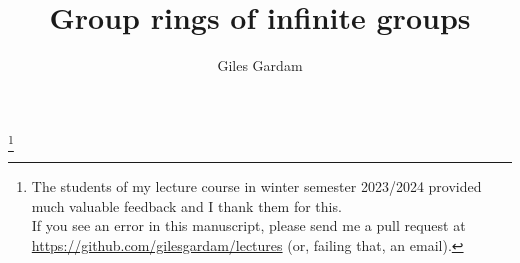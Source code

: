 \documentclass[oneside]{amsbook}
\theoremstyle{definition}
\theoremstyle{remark}
\numberwithin{section}{chapter}
\numberwithin{equation}{chapter}
\begin{document}
\frontmatter

\title{Group rings of infinite groups}
\author{Giles Gardam}
\address{University of Bonn}
\thanks{The students of my lecture course in winter semester 2023/2024 provided much valuable feedback and I thank them for this. \\ If you see an error in this manuscript, please send me a pull request at \url{https://github.com/gilesgardam/lectures} (or, failing that, an email).}

\maketitle
\tableofcontents


\mainmatter



\appendix



\backmatter




\printindex
\end{document}
